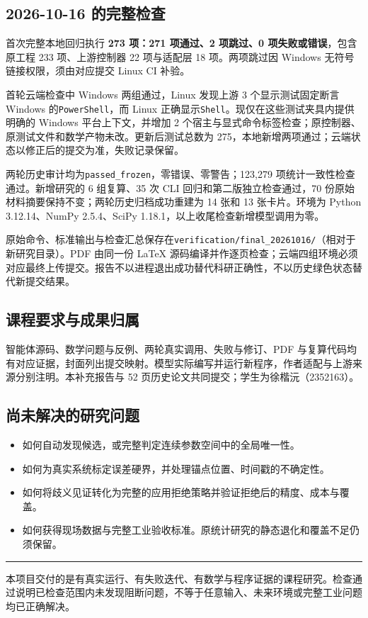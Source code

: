 \documentclass[UTF8,a4paper,zihao=-4,fontset=none]{ctexart}
\newcommand{\code}[1]{{\small\nolinkurl{#1}}}
\begin{document}
\subsection{2026-10-16 的完整检查}
首次完整本地回归执行 \textbf{273 项：271 项通过、2 项跳过、0 项失败或错误}，包含原工程 233 项、上游控制器 22 项与适配层 18 项。两项跳过因 Windows 无符号链接权限，须由对应提交 Linux CI 补验。

首轮云端检查中 Windows 两组通过，Linux 发现上游 3 个显示测试固定断言 Windows 的\texttt{PowerShell}，而 Linux 正确显示\texttt{Shell}。现仅在这些测试夹具内提供明确的 Windows 平台上下文，并增加 2 个宿主与显式命令标签检查；原控制器、原测试文件和数学产物未改。更新后测试总数为 275，本地新增两项通过；云端状态以修正后的提交为准，失败记录保留。

两轮历史审计均为\code{passed_frozen}，零错误、零警告；123,279 项统计一致性检查通过。新增研究的 6 组复算、35 次 CLI 回归和第二版独立检查通过，70 份原始材料摘要保持不变；两轮历史归档成功重建为 14 张和 13 张卡片。环境为 Python 3.12.14、NumPy 2.5.4、SciPy 1.18.1，以上收尾检查新增模型调用为零。

原始命令、标准输出与检查汇总保存在\code{verification/final_20261016/}（相对于新研究目录）。PDF 由同一份 LaTeX 源码编译并作逐页检查；云端四组环境必须对应最终上传提交。报告不以进程退出成功替代科研正确性，不以历史绿色状态替代新提交结果。

\subsection{课程要求与成果归属}
智能体源码、数学问题与反例、两轮真实调用、失败与修订、PDF 与复算代码均有对应证据，封面列出提交映射。模型实际编写并运行新程序，作者适配与上游来源分别注明。本补充报告与 52 页历史论文共同提交；学生为徐楷沅（2352163）。

\subsection{尚未解决的研究问题}
\begin{itemize}
\item 如何自动发现候选，或完整判定连续参数空间中的全局唯一性。
\item 如何为真实系统标定误差硬界，并处理锚点位置、时间戳的不确定性。
\item 如何将歧义见证转化为完整的应用拒绝策略并验证拒绝后的精度、成本与覆盖。
\item 如何获得现场数据与完整工业验收标准。原统计研究的静态退化和覆盖不足仍须保留。
\end{itemize}

\vfill\noindent\textcolor{teal}{\rule{\textwidth}{.6pt}}
{\small\color{muted}本项目交付的是有真实运行、有失败迭代、有数学与程序证据的课程研究。检查通过说明已检查范围内未发现阻断问题，不等于任意输入、未来环境或完整工业问题均已正确解决。}
\endgroup
\end{document}
